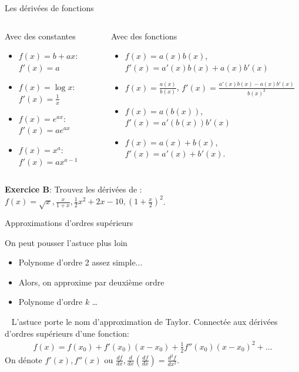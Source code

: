 \documentclass[handout]{beamer}
\begin{document}
\begin{frame}{Les dérivées de fonctions}

\begin{columns}
\footnotesize
\begin{column}{0.5\textwidth}
   Avec des constantes
   \begin{itemize}
   		\item $f(x) = b + ax$: $f'(x) = a$
		\item $f(x) = \log x$: $f'(x) = \frac{1}{x}$
		\item $f(x) = e^{ax}$: $f'(x) = ae^{ax}$ 
		\item $f(x) = x^a$: $f'(x) = a x^{a-1}$
   \end{itemize}
\end{column}
\begin{column}{0.5\textwidth}  %
	Avec des fonctions
	\begin{itemize}
		\item $f(x) = a(x)b(x)$, $f'(x) = a'(x)b(x) + a(x)b'(x)$
		\item $f(x) = \frac{a(x)}{b(x)}$, $f'(x) = \frac{a'(x)b(x) - a(x)b'(x)}{b(x)^2}$
		\item $f(x) = a(b(x))$, $f'(x) = a'(b(x))b'(x)$
		\item $f(x) = a(x) + b(x)$, $f'(x) = a'(x) + b'(x)$. 
	\end{itemize}
\end{column}
\end{columns}
\vspace{0.5in}
\textbf{Exercice B}: Trouvez les dérivées de : $f(x)=\sqrt{x},\frac{x}{1+x},\frac{1}{2}x^2 + 2x-10,(1+\frac{x}{2})^2$.
\end{frame}


\begin{frame}{Approximations d'ordres supérieurs}

On peut pousser l'astuce plus loin
\begin{itemize}
\item Polynome d'ordre 2 assez simple...
\item Alors, on approxime par deuxième ordre
\item Polynome d'ordre $k$ \ldots
\end{itemize}\
\pause
L'astuce porte le nom d'approximation de Taylor. Connectée aux dérivées d'ordres supérieurs d'une fonction:
\begin{eqnarray*}
	f(x) = f(x_0) + f'(x_0)(x-x_0) +\frac{1}{2}f''(x_0)(x-x_0)^2 + \ldots 
\end{eqnarray*}
On dénote $f'(x), f''(x)$ ou $\frac{d f}{d x},\frac{d}{d x}(\frac{d f}{d x}) = \frac{d^2 f}{d x^2} $.
\end{frame}
\end{document}
